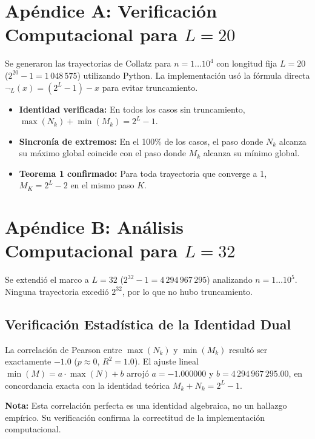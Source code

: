 \documentclass[11pt,a4paper]{article}
\begin{document}
\appendix

\section{Apéndice A: Verificación Computacional para $L=20$}
\label{app:basic}

Se generaron las trayectorias de Collatz para $n = 1 \dots 10^4$ con longitud fija $L=20$ ($2^{20}-1 = 1\,048\,575$) utilizando Python. La implementación usó la fórmula directa $\neg_L(x) = (2^L-1) - x$ para evitar truncamiento.

\begin{itemize}
    \item \textbf{Identidad verificada:} En todos los casos sin truncamiento, $\max(N_k) + \min(M_k) = 2^L - 1$.
    \item \textbf{Sincronía de extremos:} En el 100\% de los casos, el paso donde $N_k$ alcanza su máximo global coincide con el paso donde $M_k$ alcanza su mínimo global.
    \item \textbf{Teorema 1 confirmado:} Para toda trayectoria que converge a 1, $M_K = 2^L - 2$ en el mismo paso $K$.
\end{itemize}

\section{Apéndice B: Análisis Computacional para $L=32$}
\label{app:L32}

Se extendió el marco a $L=32$ ($2^{32}-1 = 4\,294\,967\,295$) analizando $n = 1 \dots 10^5$. Ninguna trayectoria excedió $2^{32}$, por lo que no hubo truncamiento.

\subsection{Verificación Estadística de la Identidad Dual}

La correlación de Pearson entre $\max(N_k)$ y $\min(M_k)$ resultó ser exactamente $-1.0$ ($p \approx 0$, $R^2 = 1.0$). El ajuste lineal $\min(M) = a \cdot \max(N) + b$ arrojó $a = -1.000000$ y $b = 4\,294\,967\,295.00$, en concordancia exacta con la identidad teórica $M_k + N_k = 2^L - 1$.

\textbf{Nota:} Esta correlación perfecta es una identidad algebraica, no un hallazgo empírico. Su verificación confirma la correctitud de la implementación computacional.
\end{document}

